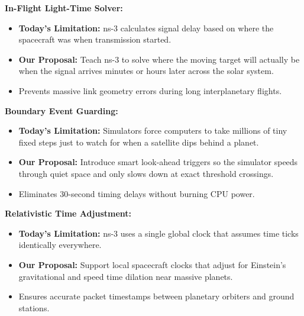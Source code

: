\documentclass[9pt]{article}
\begin{document}
\begin{minipage}[t]{0.32\textwidth}
    \begin{tcolorbox}[posterbox, title=Blueprint 1: Aim Where the Spacecraft Will Be, height=5.0cm]
        {\color{darkCyan}\textbf{In-Flight Light-Time Solver:}}
        \begin{itemize}[leftmargin=8pt, itemsep=2pt, topsep=1pt]
            \item \textbf{Today's Limitation:} ns-3 calculates signal delay based on where the spacecraft was when transmission started.
            \item \textbf{Our Proposal:} Teach ns-3 to solve where the moving target will actually be when the signal arrives minutes or hours later across the solar system.
            \item Prevents massive link geometry errors during long interplanetary flights.
        \end{itemize}
    \end{tcolorbox}
\end{minipage}%
\hfill
\begin{minipage}[t]{0.32\textwidth}
    \begin{tcolorbox}[posterbox, title=Blueprint 2: Smart Early-Warning Alarms, height=5.0cm]
        {\color{darkCyan}\textbf{Boundary Event Guarding:}}
        \begin{itemize}[leftmargin=8pt, itemsep=2pt, topsep=1pt]
            \item \textbf{Today's Limitation:} Simulators force computers to take millions of tiny fixed steps just to watch for when a satellite dips behind a planet.
            \item \textbf{Our Proposal:} Introduce smart look-ahead triggers so the simulator speeds through quiet space and only slows down at exact threshold crossings.
            \item Eliminates 30-second timing delays without burning CPU power.
        \end{itemize}
    \end{tcolorbox}
\end{minipage}%
\hfill
\begin{minipage}[t]{0.33\textwidth}
    \begin{tcolorbox}[posterbox, title=Blueprint 3: Deep-Space Multi-Clock Sync, height=5.0cm]
        {\color{darkCyan}\textbf{Relativistic Time Adjustment:}}
        \begin{itemize}[leftmargin=8pt, itemsep=2pt, topsep=1pt]
            \item \textbf{Today's Limitation:} ns-3 uses a single global clock that assumes time ticks identically everywhere.
            \item \textbf{Our Proposal:} Support local spacecraft clocks that adjust for Einstein's gravitational and speed time dilation near massive planets.
            \item Ensures accurate packet timestamps between planetary orbiters and ground stations.
        \end{itemize}
    \end{tcolorbox}
\end{minipage}
\end{document}

